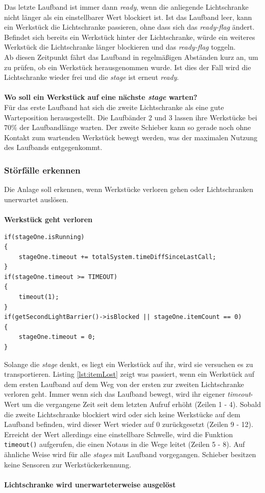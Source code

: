 \documentclass[fontsize=11pt,a4paper,final]{scrartcl}[2003/01/01]
\begin{document}
Das letzte Laufband ist immer dann \textit{ready}, wenn die anliegende Lichtschranke nicht länger als ein einstellbarer Wert blockiert ist. Ist das Laufband leer, kann ein Werkstück die Lichtschranke passieren, ohne dass sich das \textit{ready-flag} ändert. Befindet sich bereits ein Werkstück hinter der Lichtschranke, würde ein weiteres Werkstück die Lichtschranke länger blockieren und das \textit{ready-flag} toggeln. \\ 
Ab diesen Zeitpunkt fährt das Laufband in regelmäßigen Abständen kurz an, um zu prüfen, ob ein Werkstück herausgenommen wurde. Ist dies der Fall wird die Lichtschranke wieder frei und die \textit{stage} ist erneut \textit{ready}. \\ \\
\textbf{Wo soll ein Werkstück auf eine nächste \textit{stage} warten?} \\
Für das erste Laufband hat sich die zweite Lichtschranke als eine gute Warteposition herausgestellt. Die Laufbänder 2 und 3 lassen ihre Werkstücke bei $70\%$ der Laufbandlänge warten. Der zweite Schieber kann so gerade noch ohne Kontakt zum wartenden Werkstück bewegt werden, was der maximalen Nutzung des Laufbands entgegenkommt.

\subsubsection{Störfälle erkennen}
Die Anlage soll erkennen, wenn Werkstücke verloren gehen oder Lichtschranken unerwartet auslösen. 
\\ \\
\textbf{Werkstück geht verloren}
\begin{lstlisting}[caption={Beispiel: Werkstück geht auf ersten Laufband verloren},label={lst:itemLost}]
if(stageOne.isRunning)
{
   	stageOne.timeout += totalSystem.timeDiffSinceLastCall;
}
if(stageOne.timeout >= TIMEOUT)
{
   	timeout(1);
}
if(getSecondLightBarrier()->isBlocked || stageOne.itemCount == 0)
{
   	stageOne.timeout = 0;
}
\end{lstlisting}
Solange die \textit{stage} denkt, es liegt ein Werkstück auf ihr, wird sie versuchen es zu transportieren. Listing \ref{lst:itemLost} zeigt was passiert, wenn ein Werkstück auf dem ersten Laufband auf dem Weg von der ersten zur zweiten Lichtschranke verloren geht. Immer wenn sich das Laufband bewegt, wird ihr eigener \textit{timeout}-Wert um die vergangene Zeit seit dem letzten Aufruf erhöht (Zeilen 1 - 4). Sobald die zweite Lichtschranke blockiert wird oder sich keine Werkstücke auf dem Laufband befinden, wird dieser Wert wieder auf $0$ zurückgesetzt (Zeilen 9 - 12). Erreicht der Wert allerdings eine einstellbare Schwelle, wird die Funktion \lstinline|timeout()| aufgerufen, die einen Notaus in die Wege leitet (Zeilen 5 - 8). Auf ähnliche Weise wird für alle \textit{stages} mit Laufband vorgegangen. Schieber besitzen keine Sensoren zur Werkstückerkennung.\\ \\
\textbf{Lichtschranke wird unerwarteterweise ausgelöst}
\end{document}
